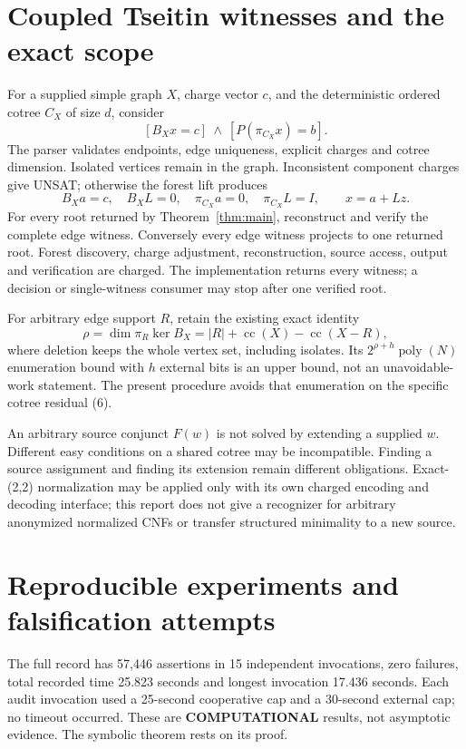 \documentclass[11pt]{article}
\begin{document}
\section{Coupled Tseitin witnesses and the exact scope}
For a supplied simple graph $X$, charge vector $c$, and the deterministic
ordered cotree $C_X$ of size $d$, consider
\[
 [B_Xx=c]\ \land\ [P(\pi_{C_X}x)=b].                   \tag{6}
\]
The parser validates endpoints, edge uniqueness, explicit charges and cotree
dimension. Isolated vertices remain in the graph. Inconsistent component
charges give UNSAT; otherwise the forest lift produces
\[
 B_Xa=c,\quad B_XL=0,\quad\pi_{C_X}a=0,
 \quad\pi_{C_X}L=I,\qquad x=a+Lz.                       \tag{7}
\]
For every root returned by Theorem~\ref{thm:main}, reconstruct and verify the
complete edge witness. Conversely every edge witness projects to one returned
root. Forest discovery, charge adjustment, reconstruction, source access,
output and verification are charged. The implementation returns every witness;
a decision or single-witness consumer may stop after one verified root.

For arbitrary edge support $R$, retain the existing exact identity
\[
 \rho=\dim\pi_R\ker B_X=|R|+\operatorname{cc}(X)
                        -\operatorname{cc}(X-R),          \tag{8}
\]
where deletion keeps the whole vertex set, including isolates. Its
$2^{\rho+h}\operatorname{poly}(N)$ enumeration bound with $h$ external bits
is an upper bound, not an unavoidable-work statement. The present procedure
avoids that enumeration on the specific cotree residual (6).

An arbitrary source conjunct $F(w)$ is not solved by extending a supplied $w$.
Different easy conditions on a shared cotree may be incompatible. Finding a
source assignment and finding its extension remain different obligations.
Exact-(2,2) normalization may be applied only with its own charged encoding
and decoding interface; this report does not give a recognizer for arbitrary
anonymized normalized CNFs or transfer structured minimality to a new source.

\section{Reproducible experiments and falsification attempts}
The full record has 57,446 assertions in 15 independent invocations,
zero failures, total recorded time 25.823 seconds and longest invocation
17.436 seconds. Each audit invocation used a 25-second cooperative cap and
a 30-second external cap; no timeout occurred. These are \textbf{COMPUTATIONAL}
results, not asymptotic evidence. The symbolic theorem rests on its proof.
\end{document}

